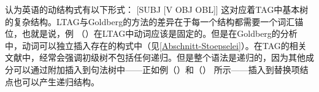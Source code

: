  \citet[]{Goldberg95a}认为英语的动结构式有以下形式：
\ea
{}[SUBJ [V OBJ OBL]] 
\z
这对应着TAG中基本树的复杂结构。LTAG与Goldberg的方法的差异在于每一个结构都需要一个词汇锚位，也就是说，例 （）在LTAG中动词应该是固定的。但是在Goldberg的分析中，动词可以独立插入存在的构式中（见\ref{Abschnitt-Stoepselei}）。在TAG的相关文献中，经常会强调初级树不包括任何递归。但是整个语法是递归的，因为其他成分可以通过附加插入到句法树中——正如例（）和（） 所示——插入到替换项结点也可以产生递归结构。



